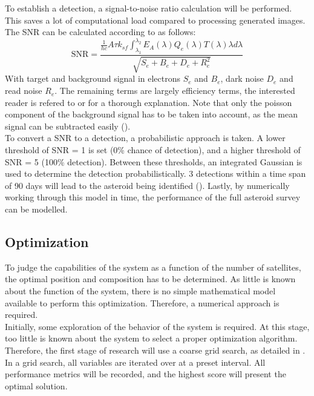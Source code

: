 \documentclass[12pt, english, NoHyper]{AE4010-template}
\begin{document}
To establish a detection, a signal-to-noise ratio calculation will be performed. This saves a lot of computational load compared to processing generated images. The SNR can be calculated according to \cite{NEODetection} as follows:
\begin{equation}
\mathrm{SNR} = \frac{\frac{1}{hc}A\tau k_{sf} \int_{\lambda_1}^{\lambda_2}E_A(\lambda)Q_e(\lambda)T(\lambda)\lambda d \lambda}{\sqrt{S_e + B_e + D_e + R_e^2}}
\end{equation}
With target and background signal in electrons $S_e$ and $B_e$, dark noise $D_e$ and read noise $R_e$. The remaining terms are largely efficiency terms, the interested reader is refered to \cite{NEODetection} or \cite{OpNav} for a thorough explanation. Note that only the poisson component of the background signal has to be taken into account, as the mean signal can be subtracted easily (\cite{OpNav}).\\

To convert a SNR to a detection, a probabilistic approach is taken. A lower threshold of SNR = 1 is set (0\% chance of detection), and a higher threshold of SNR = 5 (100\% detection). Between these thresholds, an integrated Gaussian is used to determine the detection probabilistically. 3 detections within a time span of 90 days will lead to the asteroid being identified (\cite{NEOSDT1}). Lastly, by numerically working through this model in time, the performance of the full asteroid survey can be modelled.

\subsection{Optimization}
To judge the capabilities of the system as a function of the number of satellites, the optimal position and composition has to be determined. As little is known about the function of the system, there is no simple mathematical model available to perform this optimization. Therefore, a numerical approach is required. \\

Initially, some exploration of the behavior of the system is required. At this stage, too little is known about the system to select a proper optimization algorithm. Therefore, the first stage of research will use a coarse grid search, as detailed in \cite{DLOne}. In a grid search, all variables are iterated over at a preset interval. All performance metrics will be recorded, and the highest score will present the optimal solution. \\
\end{document}
